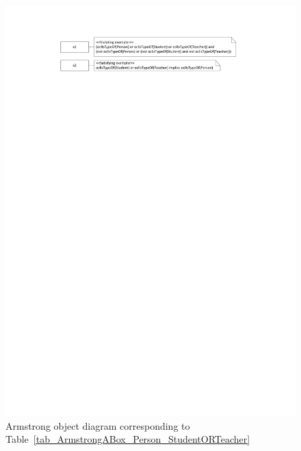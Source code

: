 \documentclass{amsart}
\begin{document}
    \begin{figure}
    \centering \includegraphics[trim = 20mm 245mm 0mm 20mm, clip, scale=0.9]{./ArmstrongOD_Person_StudentORTeacher.pdf}
    \caption{Armstrong object diagram corresponding to Table~\ref{tab_ArmstrongABox_Person_StudentORTeacher}}\label{fig_ArmstrongOD_Person_StudentORTeacher}
    \end{figure} 
    
\end{document}
